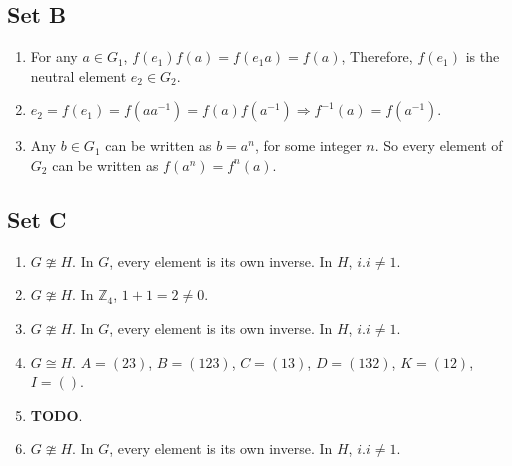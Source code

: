 \documentclass{article}
\begin{document}
\subsection{Set B}
\begin{enumerate}
    \item For any $ a \in G_1 $, $ f(e_1)f(a) = f(e_1a) = f(a) $, Therefore, $ f(e_1) $ is the neutral element $ e_2 \in G_2 $.
    
    \item $ e_2 = f(e_1) = f(aa^{-1}) =f(a)f(a^{-1}) \Rightarrow f^{-1}(a) = f(a^{-1}) $.
    
    \item Any $ b \in G_1 $ can be written as $ b = a^n $, for some integer $n$. So every element of $ G_2 $ can be written as $ f(a^n) = f^n(a) $.
\end{enumerate}

\subsection{Set C}
\begin{enumerate}
    \item $ G \ncong H $. In $ G $, every element is its own inverse. In $ H $, $ i.i \ne 1 $.
    
    \item $ G \ncong H $. In $ \mathbb{Z}_4 $, $ 1 + 1 = 2 \ne 0 $.
    
    \item $ G \ncong H $. In $ G $, every element is its own inverse. In $ H $, $ i.i \ne 1 $.
    
    \item $ G \cong H $. $ A = (23) $, $ B = (123) $, $ C = (13) $, $ D = (132) $, $ K = (12) $, $ I = () $.
    
    \item \textbf{TODO}.
    
    \item $ G \ncong H $. In $ G $, every element is its own inverse. In $ H $, $ i.i \ne 1 $.
\end{enumerate}
\end{document}
